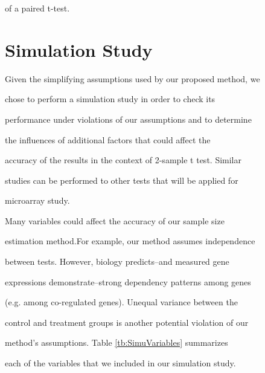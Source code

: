 \documentclass[12pt]{article}
\begin{document}
of a paired t-test.



\section{Simulation Study}



Given the simplifying assumptions used by our proposed method, we

chose to perform a simulation study in order to check its

performance under violations of our assumptions and to determine

the influences of additional factors that could affect the

accuracy of the results in the context of 2-sample t test. Similar

studies can be performed to other tests that will be applied for

microarray study.



Many variables could affect the accuracy of our sample size

estimation method.For example, our method assumes independence

between tests. However, biology predicts--and measured gene

expressions demonstrate--strong dependency patterns among genes

(e.g. among co-regulated genes).  Unequal variance between the

control and treatment groups is another potential violation of our

method's assumptions.  Table \ref{tb:SimuVariables} summarizes

each of the variables that we included in our simulation study.
\end{document}
